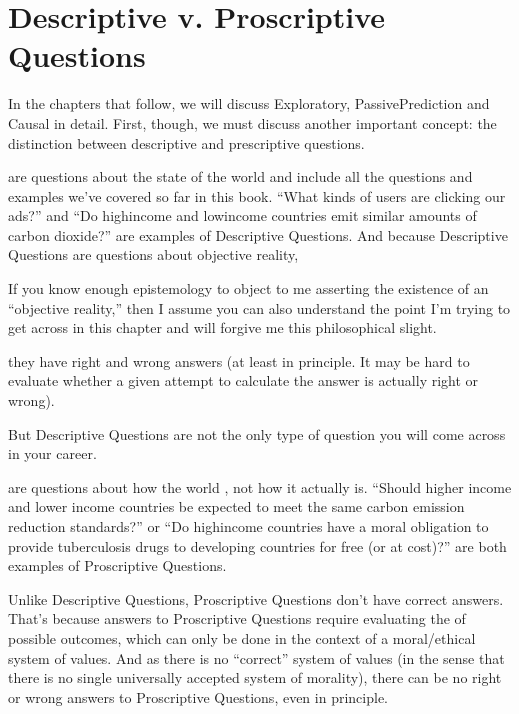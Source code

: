 \documentclass[letterpaper,10pt,english]{jupyterBook}
\begin{document}
\chapter{Descriptive v. Proscriptive Questions}
\label{\detokenize{30_questions/05_descriptive_v_proscriptive:descriptive-v-proscriptive-questions}}\label{\detokenize{30_questions/05_descriptive_v_proscriptive::doc}}
\sphinxAtStartPar
In the chapters that follow, we will discuss Exploratory, Passive\sphinxhyphen{}Prediction and Causal in detail. First, though, we must discuss another important concept: the distinction between descriptive and prescriptive questions.

\sphinxAtStartPar
{} are questions about the state of the world and include all the questions and examples we’ve covered so far in this book. “What kinds of users are clicking our ads?” and “Do high\sphinxhyphen{}income and low\sphinxhyphen{}income countries emit similar amounts of carbon dioxide?” are examples of Descriptive Questions. And because Descriptive Questions are questions about objective reality,%
\begin{footnote}[1]\sphinxAtStartFootnote
If you know enough epistemology to object to me asserting the existence of an “objective reality,” then I assume you can also understand the point I’m trying to get across in this chapter and will forgive me this philosophical slight.
%
\end{footnote} they have right and wrong answers (at least in principle. It may be hard to evaluate whether a given attempt to calculate the answer is actually right or wrong).

\sphinxAtStartPar
But Descriptive Questions are not the only type of question you will come across in your career.

\sphinxAtStartPar
{} are questions about how the world , not how it actually is. “Should higher income and lower income countries be expected to meet the same carbon emission reduction standards?” or “Do high\sphinxhyphen{}income countries have a moral obligation to provide tuberculosis drugs to developing countries for free (or at cost)?” are both examples of Proscriptive Questions.

\sphinxAtStartPar
Unlike Descriptive Questions, Proscriptive Questions don’t have correct answers. That’s because answers to Proscriptive Questions require evaluating the  of possible outcomes, which can only be done in the context of a moral/ethical system of values. And as there is no “correct” system of values (in the sense that there is no single universally accepted system of morality), there can be no right or wrong answers to Proscriptive Questions, even in principle.
\end{document}
